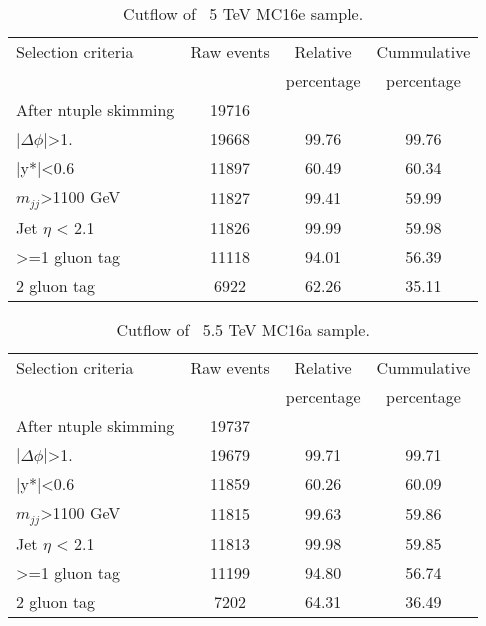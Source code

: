 \begin{table}[ht]
\begin{center}
\begin{tabular}{|l|c|c|c|}
\hline
Selection criteria & Raw events &  Relative & Cummulative \\
 & & percentage & percentage \\
\hline
After ntuple skimming & 19716 &  &  \\
$|\Delta\phi|$>1. & 19668 & 99.76 & 99.76 \\
|y*|<0.6 & 11897 & 60.49 & 60.34 \\
$m_{jj}$>1100 GeV & 11827 & 99.41 & 59.99 \\
Jet $\eta$ < 2.1 & 11826 & 99.99 & 59.98 \\
>=1 gluon tag & 11118 & 94.01 & 56.39 \\
2 gluon tag & 6922 & 62.26 & 35.11 \\
\hline
\end{tabular}
\end{center}
\caption{Cutflow of \Hprime\ 5 TeV MC16e sample.}
\end{table}


\begin{table}[ht]
\begin{center}
\begin{tabular}{|l|c|c|c|}
\hline
Selection criteria & Raw events &  Relative & Cummulative \\
 & & percentage & percentage \\
\hline
After ntuple skimming & 19737 &  &  \\
$|\Delta\phi|$>1. & 19679 & 99.71 & 99.71 \\
|y*|<0.6 & 11859 & 60.26 & 60.09 \\
$m_{jj}$>1100 GeV & 11815 & 99.63 & 59.86 \\
Jet $\eta$ < 2.1 & 11813 & 99.98 & 59.85 \\
>=1 gluon tag & 11199 & 94.80 & 56.74 \\
2 gluon tag & 7202 & 64.31 & 36.49 \\
\hline
\end{tabular}
\end{center}
\caption{Cutflow of \Hprime\ 5.5 TeV MC16a sample.}
\end{table}

